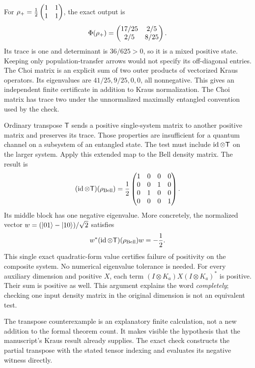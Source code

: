 For $\rho_+=\frac12\begin{pmatrix}1&1\\1&1\end{pmatrix}$, the exact output is
\[
\Phi(\rho_+)=\begin{pmatrix}17/25&2/5\\2/5&8/25\end{pmatrix}.
\]
Its trace is one and determinant is $36/625>0$, so it is a mixed positive state. Keeping only population-transfer arrows would not specify its off-diagonal entries.
The Choi matrix is an explicit sum of two outer products of vectorized Kraus operators. Its eigenvalues are $41/25,9/25,0,0$, all nonnegative. This gives an independent finite certificate in addition to Kraus normalization. The Choi matrix has trace two under the unnormalized maximally entangled convention used by the check.

Ordinary transpose $\mathsf T$ sends a positive single-system matrix to another positive matrix and preserves its trace. Those properties are insufficient for a quantum channel on a subsystem of an entangled state. The test must include $\id\otimes\mathsf T$ on the larger system.
Apply this extended map to the Bell density matrix. The result is
\[
(\id\otimes\mathsf T)(\rho_{\rm Bell})
=\frac12\mat{1&0&0&0\\0&0&1&0\\0&1&0&0\\0&0&0&1}.
\]
Its middle block has one negative eigenvalue. More concretely, the normalized vector $w=(\lvert 01\rangle-\lvert 10\rangle)/\sqrt2$ satisfies
\[
w^*(\id\otimes\mathsf T)(\rho_{\rm Bell})w=-\frac12.
\]
This single exact quadratic-form value certifies failure of positivity on the composite system. No numerical eigenvalue tolerance is needed.
For every auxiliary dimension and positive $X$, each term $(I\otimes K_a)X(I\otimes K_a)^*$ is positive. Their sum is positive as well. This argument explains the word \emph{completely}; checking one input density matrix in the original dimension is not an equivalent test.

The transpose counterexample is an explanatory finite calculation, not a new addition to the formal theorem count. It makes visible the hypothesis that the manuscript's Kraus result already supplies. The exact check constructs the partial transpose with the stated tensor indexing and evaluates its negative witness directly.


